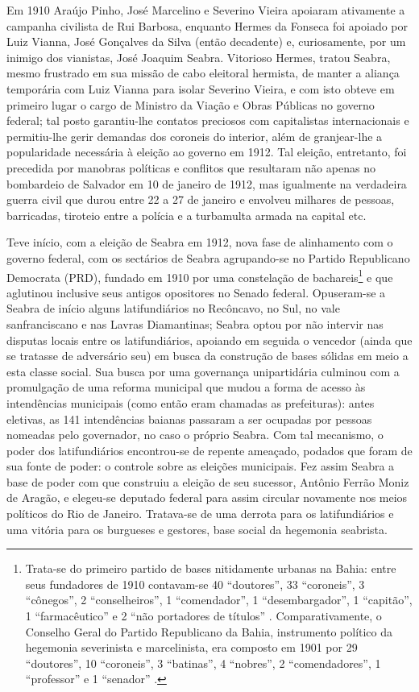 Em 1910 Araújo Pinho, José Marcelino e Severino Vieira apoiaram ativamente a campanha civilista de Rui Barbosa, enquanto Hermes da Fonseca foi apoiado por Luiz Vianna, José Gonçalves da Silva (então decadente) e, curiosamente, por um inimigo dos vianistas, José Joaquim Seabra. Vitorioso Hermes, tratou Seabra, mesmo frustrado em sua missão de cabo eleitoral hermista, de manter a aliança temporária com Luiz Vianna para isolar Severino Vieira, e com isto obteve em primeiro lugar o cargo de Ministro da Viação e Obras Públicas no governo federal; tal posto garantiu-lhe contatos preciosos com capitalistas internacionais e permitiu-lhe gerir demandas dos coroneis do interior, além de granjear-lhe a popularidade necessária à eleição ao governo em 1912. Tal eleição, entretanto, foi precedida por manobras políticas e conflitos que resultaram não apenas no bombardeio de Salvador em 10 de janeiro de 1912, mas igualmente na verdadeira guerra civil que durou entre 22 a 27 de janeiro e envolveu milhares de pessoas, barricadas, tiroteio entre a polícia e a turbamulta armada na capital etc. 

Teve início, com a eleição de Seabra em 1912, nova fase de alinhamento com o governo federal, com os sectários de Seabra agrupando-se no Partido Republicano Democrata (PRD), fundado em 1910 por uma constelação de bachareis\footnote{Trata-se do primeiro partido de bases nitidamente urbanas na Bahia: entre seus fundadores de 1910 contavam-se 40 ``doutores'', 33 ``coroneis'', 3 ``cônegos'', 2 ``conselheiros'', 1 ``comendador'', 1 ``desembargador'', 1 ``capitão'', 1 ``farmacêutico'' e 2 ``não portadores de títulos'' \cite[p.~70]{sampaio_partidos_1978}. Comparativamente, o Conselho Geral do Partido Republicano da Bahia, instrumento político da hegemonia severinista e marcelinista, era composto em 1901 por 29 ``doutores'', 10 ``coroneis'', 3 ``batinas'',  4 ``nobres'', 2 ``comendadores'', 1 ``professor'' e 1 ``senador'' \cite[p.~49]{sampaio_partidos_1978}.} e que aglutinou inclusive seus antigos opositores no Senado federal. Opuseram-se a Seabra de início alguns latifundiários no Recôncavo, no Sul, no vale sanfranciscano e nas Lavras Diamantinas; Seabra optou por não intervir nas disputas locais entre os latifundiários, apoiando em seguida o vencedor (ainda que se tratasse de adversário seu) em busca da construção de bases sólidas em meio a esta classe social. Sua busca por uma governança unipartidária culminou com a promulgação de uma reforma municipal que mudou a forma de acesso às intendências municipais (como então eram chamadas as prefeituras): antes eletivas, as 141 intendências baianas passaram a ser ocupadas por pessoas nomeadas pelo governador, no caso o próprio Seabra. Com tal mecanismo, o poder dos latifundiários encontrou-se de repente ameaçado, podados que foram de sua fonte de poder: o controle sobre as eleições municipais. Fez assim Seabra a base de poder com que construiu a eleição de seu sucessor, Antônio Ferrão Moniz de Aragão, e elegeu-se deputado federal para assim circular novamente nos meios políticos do Rio de Janeiro. Tratava-se de uma derrota para os latifundiários e uma vitória para os burgueses e gestores, base social da hegemonia seabrista.

